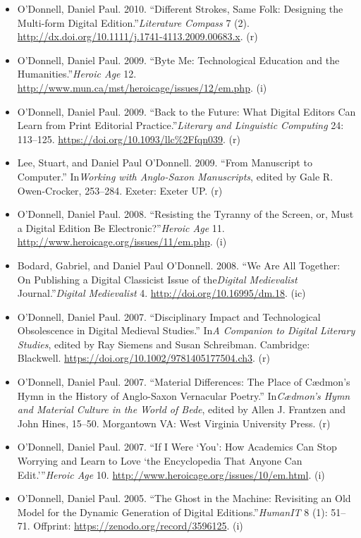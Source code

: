 \documentclass[12pt]{article}
\begin{document}
\begin{itemize}
  \item O'Donnell, Daniel Paul. 2010. “Different Strokes, Same Folk: Designing the Multi-form Digital Edition.”\textit{Literature Compass} 7 (2). \url{http://dx.doi.org/10.1111/j.1741-4113.2009.00683.x}. (r)
  \item O'Donnell, Daniel Paul. 2009. “Byte Me: Technological Education and the Humanities.”\textit{Heroic Age} 12. \url{http://www.mun.ca/mst/heroicage/issues/12/em.php}. (i)
  \item O'Donnell, Daniel Paul. 2009. “Back to the Future: What Digital Editors Can Learn from Print Editorial Practice.”\textit{Literary and Linguistic Computing} 24: 113–125. \url{https://doi.org/10.1093/llc\%2Ffqn039}. (r)
  \item Lee, Stuart, and Daniel Paul O'Donnell. 2009. “From Manuscript to Computer.” In\textit{Working with Anglo-Saxon Manuscripts}, edited by Gale R. Owen-Crocker, 253–284. Exeter: Exeter UP. (r)
  \item O'Donnell, Daniel Paul. 2008. “Resisting the Tyranny of the Screen, or, Must a Digital Edition Be Electronic?”\textit{Heroic Age} 11. \url{http://www.heroicage.org/issues/11/em.php}. (i)
  \item Bodard, Gabriel, and Daniel Paul O'Donnell. 2008. “We Are All Together: On Publishing a Digital Classicist Issue of the\textit{Digital Medievalist} Journal.”\textit{Digital Medievalist} 4. \url{http://doi.org/10.16995/dm.18}. (ic)
  \item O'Donnell, Daniel Paul. 2007. “Disciplinary Impact and Technological Obsolescence in Digital Medieval Studies.” In\textit{A Companion to Digital Literary Studies}, edited by Ray Siemens and Susan Schreibman. Cambridge: Blackwell. \url{https://doi.org/10.1002/9781405177504.ch3}. (r)
  \item O'Donnell, Daniel Paul. 2007. “Material Differences: The Place of Cædmon's Hymn in the History of Anglo-Saxon Vernacular Poetry.” In\textit{Cædmon's Hymn and Material Culture in the World of Bede}, edited by Allen J. Frantzen and John Hines, 15–50. Morgantown VA: West Virginia University Press. (r)
  \item O'Donnell, Daniel Paul. 2007. “If I Were ‘You’: How Academics Can Stop Worrying and Learn to Love ‘the Encyclopedia That Anyone Can Edit.’”\textit{Heroic Age} 10. \url{http://www.heroicage.org/issues/10/em.html}. (i)
  \item O'Donnell, Daniel Paul. 2005. “The Ghost in the Machine: Revisiting an Old Model for the Dynamic Generation of Digital Editions.”\textit{HumanIT} 8 (1): 51–71. Offprint: \url{https://zenodo.org/record/3596125}. (i)

\end{itemize}
\end{document}
